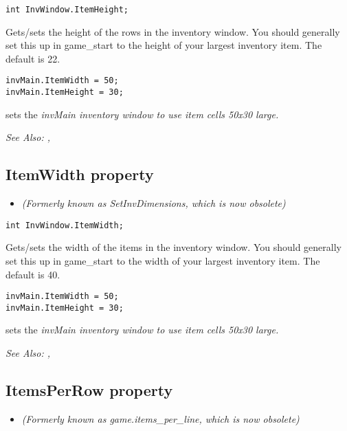 \begin{verbatim}
int InvWindow.ItemHeight;
\end{verbatim}
Gets/sets the height of the rows in the inventory window. You should generally set this
up in game_start to the height of your largest inventory item. The default is 22.

\begin{verbatim}
invMain.ItemWidth = 50;
invMain.ItemHeight = 30;
\end{verbatim}
sets the \it{invMain} inventory window to use item cells 50x30 large.

\it{See Also:} ,


\subsection{ItemWidth property}\label{InvWindow.ItemWidth}%

\begin{itemize}
\item \it{(Formerly known as SetInvDimensions, which is now obsolete)}
\end{itemize}

\begin{verbatim}
int InvWindow.ItemWidth;
\end{verbatim}
Gets/sets the width of the items in the inventory window. You should generally set this
up in game_start to the width of your largest inventory item. The default is 40.

\begin{verbatim}
invMain.ItemWidth = 50;
invMain.ItemHeight = 30;
\end{verbatim}
sets the \it{invMain} inventory window to use item cells 50x30 large.

\it{See Also:} ,


\subsection{ItemsPerRow property}\label{InvWindow.ItemsPerRow}%

\begin{itemize}
\item \it{(Formerly known as game.items_per_line, which is now obsolete)}
\end{itemize}

